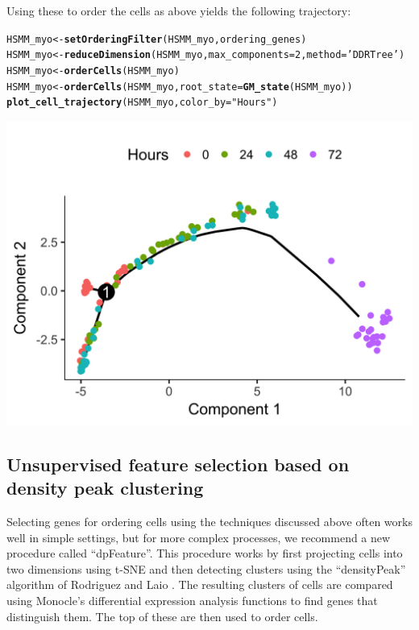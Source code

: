 \documentclass[10pt,oneside]{article}\usepackage[]{graphicx}\usepackage[]{color}
\makeatletter
\def\maxwidth{ %
  \ifdim\Gin@nat@width>\linewidth
    \linewidth
  \else
    \Gin@nat@width
  \fi
}
\newcommand{\hlnum}[1]{\textcolor[rgb]{0.686,0.059,0.569}{#1}}%
\newcommand{\hlstr}[1]{\textcolor[rgb]{0.192,0.494,0.8}{#1}}%
\newcommand{\hlstd}[1]{\textcolor[rgb]{0.345,0.345,0.345}{#1}}%
\newcommand{\hlkwb}[1]{\textcolor[rgb]{0.69,0.353,0.396}{#1}}%
\newcommand{\hlkwc}[1]{\textcolor[rgb]{0.333,0.667,0.333}{#1}}%
\newcommand{\hlkwd}[1]{\textcolor[rgb]{0.737,0.353,0.396}{\textbf{#1}}}%
\newenvironment{kframe}{%
 \def\at@end@of@kframe{}%
 \ifinner\ifhmode%
  \def\at@end@of@kframe{\end{minipage}}%
  \begin{minipage}{\columnwidth}%
 \fi\fi%
 \def\FrameCommand##1{\hskip\@totalleftmargin \hskip-\fboxsep
 \colorbox{shadecolor}{##1}\hskip-\fboxsep
     \hskip-\linewidth \hskip-\@totalleftmargin \hskip\columnwidth}%
 \MakeFramed {\advance\hsize-\width
   \@totalleftmargin\z@ \linewidth\hsize
   \@setminipage}}%
 {\par\unskip\endMakeFramed%
 \at@end@of@kframe}
\newenvironment{knitrout}{}{} %
\makeatother
\begin{document}
Using these to order the cells as above yields the following trajectory:
\begin{knitrout}
\color{fgcolor}\begin{kframe}
\begin{alltt}
\hlstd{HSMM_myo} \hlkwb{<-} \hlkwd{setOrderingFilter}\hlstd{(HSMM_myo, ordering_genes)}
\hlstd{HSMM_myo} \hlkwb{<-} \hlkwd{reduceDimension}\hlstd{(HSMM_myo,} \hlkwc{max_components}\hlstd{=}\hlnum{2}\hlstd{,} \hlkwc{method} \hlstd{=} \hlstr{'DDRTree'}\hlstd{)}
\hlstd{HSMM_myo} \hlkwb{<-} \hlkwd{orderCells}\hlstd{(HSMM_myo)}
\hlstd{HSMM_myo} \hlkwb{<-} \hlkwd{orderCells}\hlstd{(HSMM_myo,} \hlkwc{root_state}\hlstd{=}\hlkwd{GM_state}\hlstd{(HSMM_myo))}
\hlkwd{plot_cell_trajectory}\hlstd{(HSMM_myo,} \hlkwc{color_by}\hlstd{=}\hlstr{"Hours"}\hlstd{)}
\end{alltt}
\end{kframe}

{\centering \includegraphics[width=\maxwidth]{figure/order_cells_pca_unsup-1} 

}



\end{knitrout}

\subsection{Unsupervised feature selection based on density peak clustering}
Selecting genes for ordering cells using the techniques discussed above often 
works well in simple settings, but for more complex processes, we recommend a 
new procedure called ``dpFeature''. This procedure works by first projecting 
cells into two dimensions using t-SNE and then detecting clusters using the 
``densityPeak'' algorithm of Rodriguez and Laio \cite{RodriguezLaio}. The 
resulting clusters of cells are compared using Monocle's differential expression
analysis functions to find genes that distinguish them. The top of these are 
then used to order cells.
\end{document}

